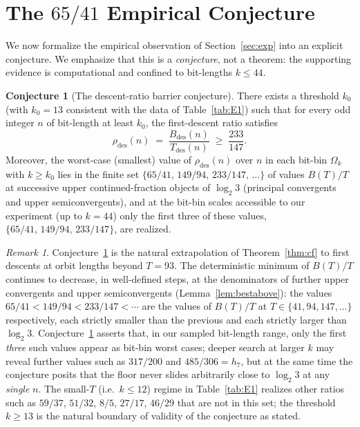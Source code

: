 \documentclass[11pt,a4paper]{article}
\theoremstyle{definition}
\newtheorem{conjecture}[theorem]{Conjecture}
\theoremstyle{remark}
\newtheorem{remark}[theorem]{Remark}
\begin{document}
\section{The $65/41$ Empirical Conjecture}\label{sec:conj}

We now formalize the empirical observation of Section~\ref{sec:exp}
into an explicit conjecture.  We emphasize that this is a
\emph{conjecture}, not a theorem: the supporting evidence is
computational and confined to bit-lengths $k \leq 44$.

\begin{conjecture}[The descent-ratio barrier conjecture]\label{conj:65-41}
There exists a threshold $k_0$ (with $k_0 = 13$ consistent with the
data of Table~\ref{tab:E1}) such that for every odd integer $n$ of
bit-length at least $k_0$, the first-descent ratio satisfies
\begin{equation}\label{eq:conj-65-41}
  \rho_{\mathrm{des}}(n) \;=\;
  \frac{B_{\mathrm{des}}(n)}{T_{\mathrm{des}}(n)}
  \;\geq\; \frac{233}{147}.
\end{equation}
Moreover, the worst-case (smallest) value of $\rho_{\mathrm{des}}(n)$
over $n$ in each bit-bin $\Omega_k$ with $k \geq k_0$ lies in the
finite set $\{65/41,\, 149/94,\, 233/147,\, \ldots\}$ of values
$B(T)/T$ at successive upper continued-fraction objects of $\log_2 3$
(principal convergents and upper semiconvergents), and at the bit-bin
scales accessible to our experiment (up to $k = 44$) only the first
three of these values, $\{65/41,\, 149/94,\, 233/147\}$, are
realized.
\end{conjecture}

\begin{remark}\label{rem:asymptotic}
Conjecture~\ref{conj:65-41} is the natural extrapolation of
Theorem~\ref{thm:cf} to first descents at orbit lengths beyond
$T = 93$.  The deterministic minimum of $B(T)/T$ continues to
decrease, in well-defined steps, at the denominators of further
upper convergents and upper semiconvergents
(Lemma~\ref{lem:bestabove}): the values $65/41 < 149/94 < 233/147 <
\cdots$ are the values of $B(T)/T$ at $T \in \{41, 94, 147, \ldots\}$
respectively, each strictly smaller than the previous and each
strictly larger than $\log_2 3$.  Conjecture~\ref{conj:65-41} asserts
that, in our sampled bit-length range, only the first \emph{three}
such values appear as bit-bin worst cases; deeper search at larger
$k$ may reveal further values such as $317/200$ and $485/306 = h_7$,
but at the same time the conjecture posits that the floor never
slides arbitrarily close to $\log_2 3$ at any \emph{single}
$n$.  The small-$T$ (i.e.\ $k \leq 12$) regime in
Table~\ref{tab:E1} realizes other ratios such as $59/37$, $51/32$,
$8/5$, $27/17$, $46/29$ that are not in this set; the threshold
$k \geq 13$ is the natural boundary of validity of the conjecture
as stated.
\end{remark}
\end{document}
